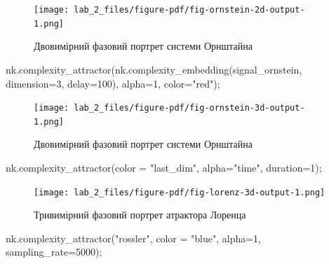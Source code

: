 \documentclass[
  letterpaper,
]{report}
\newenvironment{Shaded}{\begin{snugshade}}{\end{snugshade}}
\newcommand{\DecValTok}[1]{\textcolor[rgb]{0.68,0.00,0.00}{#1}}
\newcommand{\NormalTok}[1]{\textcolor[rgb]{0.00,0.23,0.31}{#1}}
\newcommand{\OperatorTok}[1]{\textcolor[rgb]{0.37,0.37,0.37}{#1}}
\newcommand{\StringTok}[1]{\textcolor[rgb]{0.13,0.47,0.30}{#1}}
\begin{document}
\begin{figure}[H]

{\centering \texttt{[image: lab\_2\_files/figure-pdf/fig-ornstein-2d-output-1.png]}

}

\caption{\label{fig-ornstein-2d}Двовимірний фазовий портрет системи
Орнштайна}

\end{figure}

\begin{Shaded}
\begin{Highlighting}[]
\NormalTok{nk.complexity\_attractor(nk.complexity\_embedding(signal\_ornstein, dimension}\OperatorTok{=}\DecValTok{3}\NormalTok{, delay}\OperatorTok{=}\DecValTok{100}\NormalTok{), }
\NormalTok{                        alpha}\OperatorTok{=}\DecValTok{1}\NormalTok{, }
\NormalTok{                        color}\OperatorTok{=}\StringTok{"red"}\NormalTok{)}\OperatorTok{;} 
\end{Highlighting}
\end{Shaded}

\begin{figure}[H]

{\centering \texttt{[image: lab\_2\_files/figure-pdf/fig-ornstein-3d-output-1.png]}

}

\caption{\label{fig-ornstein-3d}Двовимірний фазовий портрет системи
Орнштайна}

\end{figure}

\begin{Shaded}
\begin{Highlighting}[]
\NormalTok{nk.complexity\_attractor(color }\OperatorTok{=} \StringTok{"last\_dim"}\NormalTok{, alpha}\OperatorTok{=}\StringTok{"time"}\NormalTok{, duration}\OperatorTok{=}\DecValTok{1}\NormalTok{)}\OperatorTok{;}
\end{Highlighting}
\end{Shaded}

\begin{figure}[H]

{\centering \texttt{[image: lab\_2\_files/figure-pdf/fig-lorenz-3d-output-1.png]}

}

\caption{\label{fig-lorenz-3d}Тривимірний фазовий портрет атрактора
Лоренца}

\end{figure}

\begin{Shaded}
\begin{Highlighting}[]
\NormalTok{nk.complexity\_attractor(}\StringTok{"rossler"}\NormalTok{, color }\OperatorTok{=} \StringTok{"blue"}\NormalTok{, alpha}\OperatorTok{=}\DecValTok{1}\NormalTok{, sampling\_rate}\OperatorTok{=}\DecValTok{5000}\NormalTok{)}\OperatorTok{;}
\end{Highlighting}
\end{Shaded}
\end{document}
